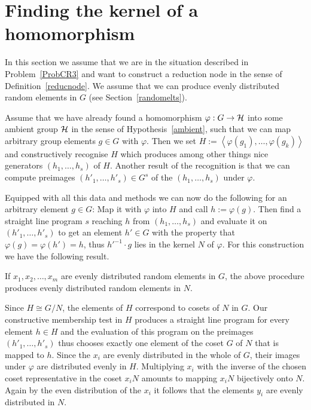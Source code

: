 \section{Finding the kernel of a homomorphism}
\label{findkernel}
%

In this section we assume that we are in the situation described in
Problem~\ref{ProbCR3} and want to construct a reduction node in the sense
of Definition~\ref{reducnode}. We assume that we can produce evenly
distributed random elements in $G$ (see Section~\ref{randomelts}).

Assume that we have already found a homomorphism
$\varphi : G \to \mathcal{H}$ into some ambient group $\mathcal{H}$ in the sense of
Hypothesis~\ref{ambient}, such that we can map arbitrary group elements
$g \in G$ with $\varphi$. Then we set $H := \left< \varphi(g_1), \ldots,
\varphi(g_k) \right>$ and constructively recognise $H$ which produces
among other things nice generators $(h_1, \ldots, h_s)$ of $H$. Another
result of the recognition is that we can compute preimages $(h'_1, \ldots,
h'_s) \in G^s$ of the $(h_1, \ldots, h_s)$ under $\varphi$.

Equipped with all this data and methods we can now do the following
for an arbitrary element $g \in G$: Map it with $\varphi$ into $H$
and call $h := \varphi(g)$. Then find a straight line program $s$ reaching
%
$h$ from $(h_1, \ldots, h_s)$ and evaluate it on $(h'_1, \ldots, h'_s)$
to get an element $h' \in G$ with the property that
$\varphi(g)=\varphi(h') = h$, thus $h'^{-1}\cdot g$ lies in the kernel $N$
of $\varphi$. For this construction we have the following result.

\begin{Prop}
\label{evendistker}
If $x_1, x_2, \ldots, x_m$ are evenly distributed random elements in $G$,
the above procedure produces evenly distributed random elements in
$N$.
\end{Prop}
\proofbeg
Since $H \cong G/N$, the elements of $H$ correspond to cosets of $N$ in
$G$. Our constructive membership test in $H$ produces a straight
line program for every element $h \in H$ and the evaluation of this
%
program on the preimages $(h'_1, \ldots, h'_s)$ thus chooses exactly one
element of the coset $G$ of $N$ that is mapped to $h$. Since the $x_i$ are evenly
distributed in the whole of $G$, their images under $\varphi$ are
distributed evenly in $H$. Multiplying $x_i$ with the inverse of the
chosen coset representative in the coset $x_iN$ amounts to mapping
$x_i N$ bijectively onto $N$. Again by the even distribution of the $x_i$
it follows that the elements $y_i$ are evenly distributed in $N$.
\proofend

